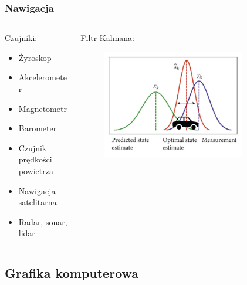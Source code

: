 \documentclass[aspectratio=169]{beamer}
\begin{document}
\begin{frame}%
	\frametitle{Nawigacja}
	\begin{columns}[T]
		\begin{column}{0.5\textwidth}
	   	 	 Czujniki:
	   	 	 \begin{itemize}
			  \item{
			    Żyroskop
			    \pause
			  }
			  \item {   
			    Akcelerometer
			    \pause
			  }
			   \item {   
			    Magnetometr
			    \pause
			  }
			  \item {   
			    Barometer
			    \pause
			  }
			  \item {   
			    Czujnik prędkości powietrza
			    \pause
			  }
			  \item {   
			    Nawigacja satelitarna
			    \pause
			  }
			  \item {   
			    Radar, sonar, lidar
			  }
	     \end{itemize}
	     \pause
	   	 	
		\end{column}
		\begin{column}{0.5\textwidth}
			Filtr Kalmana:
	   	 	\begin{figure}
	   		 \centering
	      		 \includegraphics[width=0.8\textwidth]{kalman.png}
	    		\end{figure}
		\end{column}
	\end{columns}
\end{frame}

\subsection{Grafika komputerowa}
\end{document}
